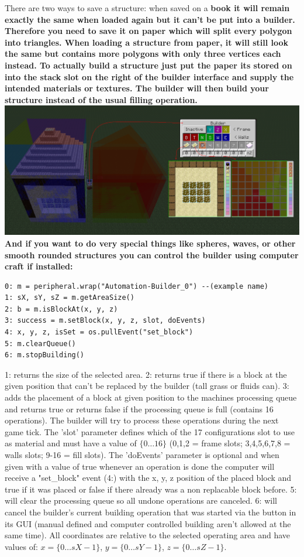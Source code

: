 \documentclass[11pt]{article} %
\begin{document}
There are two ways to save a structure: when saved on a \bf book \rm it will remain exactly the same when loaded again but it can't be put into a builder. Therefore you need to save it on \bf paper \rm which will split every polygon into triangles. When loading a structure from paper, it will still look the same but contains more polygons with only three vertices each instead. To actually build a structure just put the paper its stored on into the stack slot on the right of the builder interface and supply the intended materials or textures. The builder will then build your structure instead of the usual filling operation.\\
\includegraphics[width = \textwidth]{vertexEx}\\

And if you want to do very special things like spheres, waves, or other smooth rounded structures you can  control the builder using computer craft if installed:
\begin{lstlisting}
0: m = peripheral.wrap("Automation-Builder_0") --(example name)
1: sX, sY, sZ = m.getAreaSize() 
2: b = m.isBlockAt(x, y, z) 
3: success = m.setBlock(x, y, z, slot, doEvents)
4: x, y, z, isSet = os.pullEvent("set_block")
5: m.clearQueue()
6: m.stopBuilding()
\end{lstlisting}
1: returns the size of the selected area. 2: returns true if there is a block at the given position that can't be replaced by the builder (tall grass or fluids can). 3: adds the placement of a block at given position to the machines processing queue and returns true or returns false if the processing queue is full (contains 16 operations). The builder will try to process these operations during the next game tick. The 'slot' parameter defines which of the 17 configurations slot to use as material and must have a value of $\{ 0 \dots 16 \}$ (0,1,2 = frame slots; 3,4,5,6,7,8 = walls slots; 9-16 = fill slots). The 'doEvents' parameter is optional and when given with a value of true whenever an operation is done the computer will receive a "set\_block" event (4:) with the x, y, z position of the placed block and true if it was placed or false if there already was a non replacable block before. 5: will clear the processing queue so all undone operations are canceled. 6: will cancel the builder's current building operation that was started via the button in its GUI (manual defined and computer controlled building aren't allowed at the same time). All coordinates are relative to the selected operating area and have values of: $x=\{0 \dots sX-1\}$, $y=\{0 \dots sY - 1\}$, $z=\{0 \dots sZ - 1\}$. \\
\end{document}
